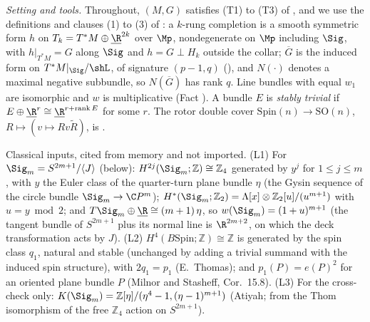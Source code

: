 \emph{Setting and tools.} Throughout, $(M,G)$ satisfies (T1) to (T3) of , and we use the definitions and clauses (1) to (3) of : a $k$-rung completion is a smooth symmetric form $h$ on $T_{k} = T^{*}M \oplus \underline{\R}^{2k}$ over $\Mp$, nondegenerate on $\Mp$ including $\Sig$, with $h|_{T^{*}M} = G$ along $\Sig$ and $h = G \perp H_{k}$ outside the collar; $\overline G$ is the induced form on $T^{*}M|_{\Sig}/\shL$, of signature $(p-1, q)$ (), and $N(\cdot)$ denotes a maximal negative subbundle, so $N(\overline G)$ has rank $q$. Line bundles with equal $w_{1}$ are isomorphic and $w$ is multiplicative (Fact ). A bundle $E$ is \emph{stably trivial} if $E \oplus \underline{\R}^{r} \cong \underline{\R}^{r + \operatorname{rank} E}$ for some $r$. The rotor double cover $\mathrm{Spin}(n) \to \mathrm{SO}(n)$, $R \mapsto (v \mapsto R v \tilde R)$, is .

Classical inputs, cited from memory and not imported. (L1) For $\Sig_{m} = S^{2m+1}/\langle J \rangle$ (below): $H^{2j}(\Sig_{m}; \mathbb{Z}) \cong \mathbb{Z}_{4}$ generated by $y^{j}$ for $1 \le j \le m$, with $y$ the Euler class of the quarter-turn plane bundle $\eta$ (the Gysin sequence of the circle bundle $\Sig_{m} \to \C P^{m}$); $H^{*}(\Sig_{m}; \mathbb{Z}_{2}) = \Lambda[x] \otimes \mathbb{Z}_{2}[u]/(u^{m+1})$ with $u = y \bmod 2$; and $T\Sig_{m} \oplus \underline{\R} \cong (m+1)\,\eta$, so $w(\Sig_{m}) = (1 + u)^{m+1}$ (the tangent bundle of $S^{2m+1}$ plus its normal line is $\R^{2m+2}$, on which the deck transformation acts by $J$). (L2) $H^{4}(B\mathrm{Spin}; \mathbb{Z}) \cong \mathbb{Z}$ is generated by the spin class $q_{1}$, natural and stable (unchanged by adding a trivial summand with the induced spin structure), with $2q_{1} = p_{1}$ (E.~Thomas); and $p_{1}(P) = e(P)^{2}$ for an oriented plane bundle $P$ (Milnor and Stasheff, Cor.~15.8). (L3) For the cross-check only: $K(\Sig_{m}) = \mathbb{Z}[\eta]/(\eta^{4} - 1, (\eta - 1)^{m+1})$ (Atiyah; from the Thom isomorphism of the free $\mathbb{Z}_{4}$ action on $S^{2m+1}$).

